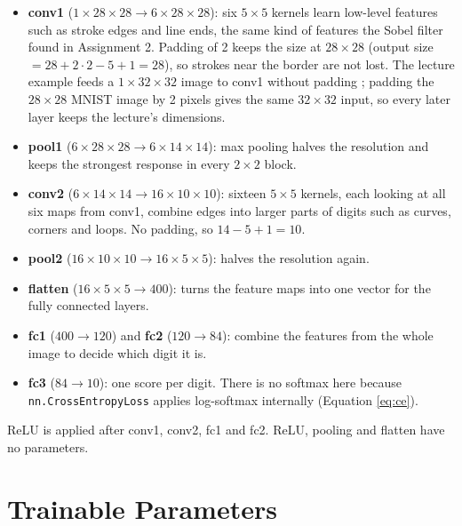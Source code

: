 \begin{itemize}
  \item \textbf{conv1} ($1 \times 28 \times 28 \rightarrow 6 \times 28 \times 28$):
        six $5 \times 5$ kernels learn low-level features such as stroke
        edges and line ends, the same kind of features the Sobel filter
        found in Assignment 2. Padding of 2 keeps the size at $28 \times 28$
        (output size $= 28 + 2\cdot2 - 5 + 1 = 28$), so strokes near the
        border are not lost. The lecture example feeds a
        $1 \times 32 \times 32$ image to conv1 without padding
        \citep{abidl08}; padding the $28 \times 28$ MNIST image by 2 pixels
        gives the same $32 \times 32$ input, so every later layer keeps the
        lecture's dimensions.
  \item \textbf{pool1} ($6 \times 28 \times 28 \rightarrow 6 \times 14 \times 14$):
        max pooling halves the resolution and keeps the strongest response
        in every $2 \times 2$ block.
  \item \textbf{conv2} ($6 \times 14 \times 14 \rightarrow 16 \times 10 \times 10$):
        sixteen $5 \times 5$ kernels, each looking at all six maps from
        conv1, combine edges into larger parts of digits such as curves,
        corners and loops. No padding, so $14 - 5 + 1 = 10$.
  \item \textbf{pool2} ($16 \times 10 \times 10 \rightarrow 16 \times 5 \times 5$):
        halves the resolution again.
  \item \textbf{flatten} ($16 \times 5 \times 5 \rightarrow 400$): turns the
        feature maps into one vector for the fully connected layers.
  \item \textbf{fc1} ($400 \rightarrow 120$) and \textbf{fc2}
        ($120 \rightarrow 84$): combine the features from the whole image
        to decide which digit it is.
  \item \textbf{fc3} ($84 \rightarrow 10$): one score per digit. There is
        no softmax here because \texttt{nn.CrossEntropyLoss} applies
        log-softmax internally (Equation \ref{eq:ce}).
\end{itemize}

ReLU is applied after conv1, conv2, fc1 and fc2. ReLU, pooling and
flatten have no parameters.


\section{Trainable Parameters}
\label{sec:params}


